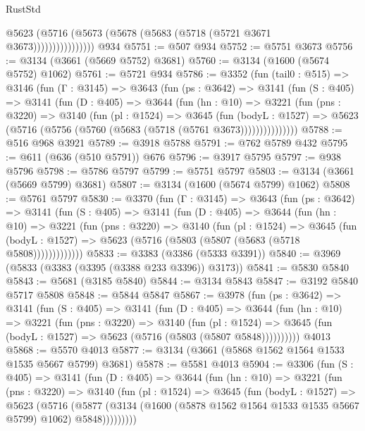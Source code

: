 \begin{lexlean}{RustStd}
\begin{coremodule}
                      @5623 (@5716 (@5673 (@5678 (@5683 (@5718 (@5721 @3671 @3673))))))))))))))))
    @934
@5751 := @507 @934
@5752 := @5751 @3673
@5756 := @3134 (@3661 (@5669 @5752) @3681)
@5760 := @3134 (@1600 (@5674 @5752) @1062)
@5761 := @5721 @934
@5786 := @3352
    (fun (tail0 : @515) =>
    @3146
      (fun (Γ : @3145) =>
      @3643
        (fun (ps : @3642) =>
        @3141
          (fun (S : @405) =>
          @3141
            (fun (D : @405) =>
            @3644
              (fun (hn : @10) =>
              @3221
                (fun (pns : @3220) =>
                @3140
                  (fun (pl : @1524) =>
                  @3645
                    (fun (bodyL : @1527) =>
                    @5623 (@5716 (@5756 (@5760 (@5683 (@5718 (@5761 @3673)))))))))))))))
@5788 := @516 @968 @3921
@5789 := @3918 @5788
@5791 := @762 @5789 @432
@5795 := @611 (@636 (@510 @5791)) @676
@5796 := @3917 @5795
@5797 := @938 @5796
@5798 := @5786 @5797
@5799 := @5751 @5797
@5803 := @3134 (@3661 (@5669 @5799) @3681)
@5807 := @3134 (@1600 (@5674 @5799) @1062)
@5808 := @5761 @5797
@5830 := @3370
    (fun (Γ : @3145) =>
    @3643
      (fun (ps : @3642) =>
      @3141
        (fun (S : @405) =>
        @3141
          (fun (D : @405) =>
          @3644
            (fun (hn : @10) =>
            @3221
              (fun (pns : @3220) =>
              @3140
                (fun (pl : @1524) =>
                @3645
                  (fun (bodyL : @1527) =>
                  @5623 (@5716 (@5803 (@5807 (@5683 (@5718 @5808)))))))))))))
@5833 := @3383 (@3386 (@5333 @3391))
@5840 := @3969 (@5833 (@3383 (@3395 (@3388 @233 @3396)) @3173))
@5841 := @5830 @5840
@5843 := @5681 (@3185 @5840)
@5844 := @3134 @5843
@5847 := @3192 @5840 @5717 @5808
@5848 := @5844 @5847
@5867 := @3978
    (fun (ps : @3642) =>
    @3141
      (fun (S : @405) =>
      @3141
        (fun (D : @405) =>
        @3644
          (fun (hn : @10) =>
          @3221
            (fun (pns : @3220) =>
            @3140
              (fun (pl : @1524) =>
              @3645 (fun (bodyL : @1527) => @5623 (@5716 (@5803 (@5807 @5848))))))))))
    @4013
@5868 := @5570 @4013
@5877 := @3134 (@3661 (@5868 @1562 @1564 @1533 @1535 @5667 @5799) @3681)
@5878 := @5581 @4013
@5904 := @3306
    (fun (S : @405) =>
    @3141
      (fun (D : @405) =>
      @3644
        (fun (hn : @10) =>
        @3221
          (fun (pns : @3220) =>
          @3140
            (fun (pl : @1524) =>
            @3645
              (fun (bodyL : @1527) =>
              @5623
                (@5716
                  (@5877
                    (@3134 (@1600 (@5878 @1562 @1564 @1533 @1535 @5667 @5799) @1062) @5848)))))))))

\end{coremodule}
\end{lexlean}
